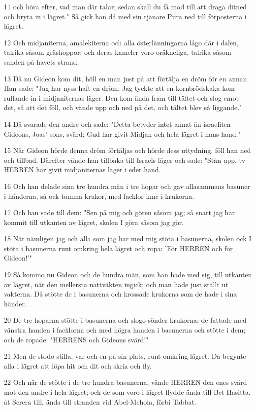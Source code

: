 \par 11 och höra efter, vad man där talar; sedan skall du få mod till att draga ditned och bryta in i lägret." Så gick han då med sin tjänare Pura ned till förposterna i lägret.
\par 12 Och midjaniterna, amalekiterna och alla österlänningarna lågo där i dalen, talrika såsom gräshoppor; och deras kameler voro oräkneliga, talrika såsom sanden på havets strand.
\par 13 Då nu Gideon kom dit, höll en man just på att förtälja en dröm för en annan. Han sade: "Jag har nyss haft en dröm. Jag tyckte att en kornbrödskaka kom rullande in i midjaniternas läger. Den kom ända fram till tältet och slog emot det, så att det föll, och vände upp och ned på det, och tältet blev så liggande."
\par 14 Då svarade den andre och sade: "Detta betyder intet annat än israeliten Gideons, Joas' sons, svärd; Gud har givit Midjan och hela lägret i hans hand."
\par 15 När Gideon hörde denna dröm förtäljas och hörde dess uttydning, föll han ned och tillbad. Därefter vände han tillbaka till Israels läger och sade: "Stån upp, ty HERREN har givit midjaniternas läger i eder hand.
\par 16 Och han delade sina tre hundra män i tre hopar och gav allasammans basuner i händerna, så ock tomma krukor, med facklor inne i krukorna.
\par 17 Och han sade till dem: "Sen på mig och gören såsom jag; så snart jag har kommit till utkanten av lägret, skolen I göra såsom jag gör.
\par 18 När nämligen jag och alla som jag har med mig stöta i basunerna, skolen ock I stöta i basunerna runt omkring hela lägret och ropa: 'För HERREN och för Gideon!'"
\par 19 Så kommo nu Gideon och de hundra män, som han hade med sig, till utkanten av lägret, när den mellersta nattväkten ingick; och man hade just ställt ut vakterna. Då stötte de i basunerna och krossade krukorna som de hade i sina händer.
\par 20 De tre hoparna stötte i basunerna och slogo sönder krukorna; de fattade med vänstra handen i facklorna och med högra handen i basunerna och stötte i dem; och de ropade: "HERRENS och Gideons svärd!"
\par 21 Men de stodo stilla, var och en på sin plats, runt omkring lägret. Då begynte alla i lägret att löpa hit och dit och skria och fly.
\par 22 Och när de stötte i de tre hundra basunerna, vände HERREN den enes svärd mot den andre i hela lägret; och de som voro i lägret flydde ända till Bet-Hasitta, åt Serera till, ända till stranden vid Abel-Mehola, förbi Tabbat.
